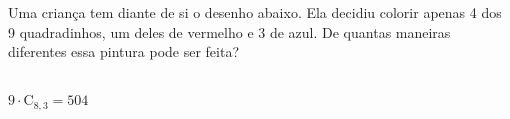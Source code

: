 \begin{ex}
Uma criança tem diante de si o desenho abaixo. Ela decidiu colorir apenas 4 dos 9 quadradinhos, um deles de vermelho e 3 de azul. De quantas maneiras diferentes essa pintura pode ser feita?
\begin{center}
\end{center}
  \begin{sol}
    \phantom{A} \\
    $9\cdot\mathrm{C}_{8,3}=504$
  \end{sol}

\end{ex}